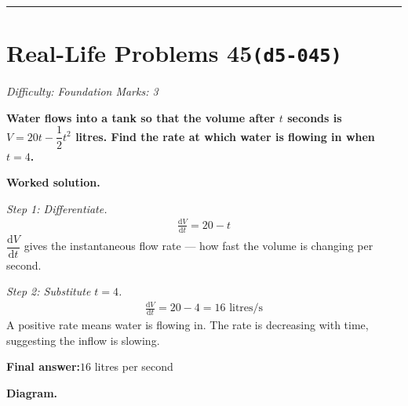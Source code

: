 \documentclass[11pt]{article}
\newcommand{\question}[1]{\par\medskip\noindent\textbf{#1}\par}
\begin{document}
\medskip\hrule

\section*{Real-Life Problems 45\quad\small\texttt{(d5-045)}}
\textit{Difficulty: Foundation \quad\textbar\quad Marks: 3}

\question{Water flows into a tank so that the volume after \( t \) seconds is \( V = 20t - \dfrac{1}{2}t^2 \) litres. Find the rate at which water is flowing in when \( t = 4 \).}

\textbf{Worked solution.}

\textit{Step 1: Differentiate.}
\[\begin{gathered}
\frac{\mathrm{d}V}{\mathrm{d}t} = 20 - t
\end{gathered}\]
\( \dfrac{\mathrm{d}V}{\mathrm{d}t} \) gives the instantaneous flow rate --- how fast the volume is changing per second.

\textit{Step 2: Substitute \( t = 4 \).}
\[\begin{gathered}
\frac{\mathrm{d}V}{\mathrm{d}t} = 20 - 4 = 16 \text{ litres/s}
\end{gathered}\]
A positive rate means water is flowing in. The rate is decreasing with time, suggesting the inflow is slowing.

\begin{answerbox}
\textbf{Final answer:}\quad \(\displaystyle  16 \) litres per second
\end{answerbox}
\textbf{Diagram.}
\end{document}

